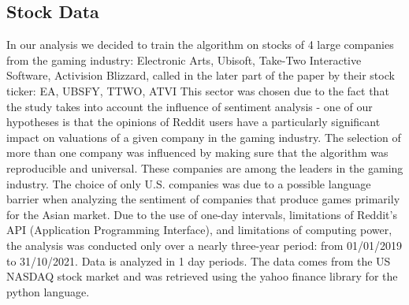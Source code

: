 \documentclass[11pt]{article} %
\begin{document}
\subsection{Stock Data}
In our analysis we decided to train the algorithm on stocks of 4 large companies from the gaming industry: Electronic Arts, Ubisoft, Take-Two Interactive Software, Activision Blizzard, called in the later part of the paper by their stock ticker: EA, UBSFY, TTWO, ATVI This sector was chosen due to the fact that the study takes into account the influence of sentiment analysis - one of our hypotheses is that the opinions of Reddit users have a particularly significant impact on valuations of a given company in the gaming industry.  The selection of more than one company was influenced by making sure that the algorithm was reproducible and universal. These companies are among the leaders in the gaming industry. The choice of only U.S. companies was due to a possible language barrier when analyzing the sentiment of companies that produce games primarily for the Asian market. Due to the use of one-day intervals, limitations of Reddit's API (Application Programming Interface), and limitations of computing power, the analysis was conducted only over a nearly three-year period: from 01/01/2019 to 31/10/2021. Data is analyzed in 1 day periods. The data comes from the US NASDAQ stock market and was retrieved using the yahoo finance library for the python language. 
\end{document}
